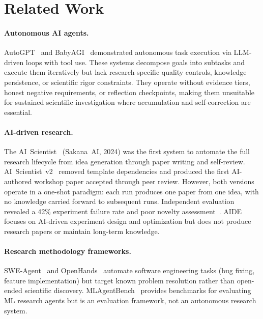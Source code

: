 \documentclass[11pt,a4paper]{article}
\begin{document}
\section{Related Work}
\label{sec:related}

\paragraph{Autonomous AI agents.}
AutoGPT~\cite{autogpt} and BabyAGI~\cite{babyagi} demonstrated autonomous task
execution via LLM-driven loops with tool use. These systems decompose goals into
subtasks and execute them iteratively but lack research-specific quality controls,
knowledge persistence, or scientific rigor constraints. They operate without evidence
tiers, honest negative requirements, or reflection checkpoints, making them unsuitable
for sustained scientific investigation where accumulation and self-correction are
essential.

\paragraph{AI-driven research.}
The AI~Scientist~\cite{ai_scientist} (Sakana~AI, 2024) was the first system to
automate the full research lifecycle from idea generation through paper writing and
self-review. AI~Scientist~v2~\cite{ai_scientist_v2} removed template dependencies
and produced the first AI-authored workshop paper accepted through peer review.
However, both versions operate in a one-shot paradigm: each run produces one paper
from one idea, with no knowledge carried forward to subsequent runs. Independent
evaluation revealed a 42\% experiment failure rate and poor novelty
assessment~\cite{ai_scientist_eval}. AIDE~\cite{aide} focuses on AI-driven
experiment design and optimization but does not produce research papers or maintain
long-term knowledge.

\paragraph{Research methodology frameworks.}
SWE-Agent~\cite{swe_agent} and OpenHands~\cite{openhands} automate software
engineering tasks (bug fixing, feature implementation) but target known problem
resolution rather than open-ended scientific discovery. MLAgentBench~\cite{mlagentbench}
provides benchmarks for evaluating ML research agents but is an evaluation framework,
not an autonomous research system.
\end{document}
